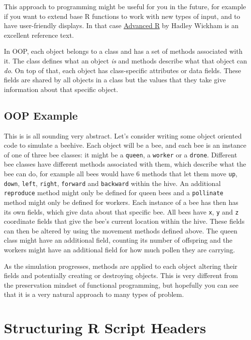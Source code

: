\documentclass[
  letterpaper,
  DIV=11,
  numbers=noendperiod]{scrreprt}
\begin{document}
This approach to programming might be useful for you in the future, for
example if you want to extend base R functions to work with new types of
input, and to have user-friendly displays. In that case
\href{https://adv-r.hadley.nz/}{Advanced R} by Hadley Wickham is an
excellent reference text.

In OOP, each object belongs to a class and has a set of methods
associated with it. The class defines what an object \emph{is} and
methods describe what that object can \emph{do}. On top of that, each
object has class-specific attributes or data fields. These fields are
shared by all objects in a class but the values that they take give
information about that specific object.

\subsection{OOP Example}\label{oop-example}

This is is all sounding very abstract. Let's consider writing some
object oriented code to simulate a beehive. Each object will be a bee,
and each bee is an instance of one of three bee classes: it might be a
\texttt{queen}, a \texttt{worker} or a \texttt{drone}. Different bee
classes have different methods associated with them, which describe what
the bee can do, for example all bees would have 6 methods that let them
move \texttt{up}, \texttt{down}, \texttt{left}, \texttt{right},
\texttt{forward} and \texttt{backward} within the hive. An additional
\texttt{reproduce} method might only be defined for queen bees and a
\texttt{pollinate} method might only be defined for workers. Each
instance of a bee has then has its own fields, which give data about
that specific bee. All bees have \texttt{x}, \texttt{y} and \texttt{z}
coordinate fields that give the bee's current location within the hive.
These fields can then be altered by using the movement methods defined
above. The queen class might have an additional field, counting its
number of offspring and the workers might have an additional field for
how much pollen they are carrying.

As the simulation progresses, methods are applied to each object
altering their fields and potentially creating or destroying objects.
This is very different from the preservation mindset of functional
programming, but hopefully you can see that it is a very natural
approach to many types of problem.

\section{Structuring R Script
Headers}\label{structuring-r-script-headers}
\end{document}

